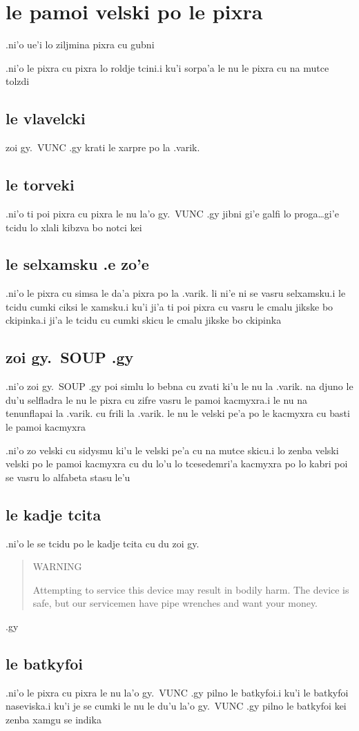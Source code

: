 \documentclass{report}
\begin{document}
\section{le pamoi velski po le pixra}
.ni'o ue'i lo ziljmina pixra cu gubni

.ni'o le pixra cu pixra lo roldje tcini\@  .i ku'i sorpa'a le nu le pixra cu na mutce tolzdi
\subsection{le vlavelcki}
zoi gy.\ VUNC .gy krati le xarpre po la .varik.
\subsection{le torveki}
.ni'o ti poi pixra cu pixra le nu la'o gy.\ VUNC .gy jibni gi'e galfi lo proga\ldots gi'e tcidu lo xlali kibzva bo notci kei
\subsection{le selxamsku .e zo'e}
.ni'o le pixra cu simsa le da'a pixra po la .varik. li ni'e ni se vasru selxamsku\@  .i le tcidu cumki ciksi le xamsku\@  .i ku'i ji'a ti poi pixra cu vasru le cmalu jikske bo ckipinka\@  .i ji'a le tcidu cu cumki skicu le cmalu jikske bo ckipinka
\subsection{zoi gy.\ SOUP .gy}
.ni'o zoi gy.\ SOUP .gy poi simlu lo bebna cu zvati ki'u le nu la .varik. na djuno le du'u selfladra le nu le pixra cu zifre vasru le pamoi kacmyxra\@  .i le nu na tenunflapai la .varik. cu frili la .varik. le nu le velski pe'a po le kacmyxra cu basti le pamoi kacmyxra

.ni'o zo velski cu sidysmu ki'u le velski pe'a cu na mutce skicu\@  .i lo zenba velski velski po le pamoi kacmyxra cu du lo'u lo tcesedemri'a kacmyxra po lo kabri poi se vasru lo alfabeta stasu le'u
\subsection{le kadje tcita}
.ni'o le se tcidu po le kadje tcita cu du zoi gy.
\begin{quote}
	WARNING

	Attempting to service this device may result in bodily harm.  The device is safe, but our servicemen have pipe wrenches and want your money.
\end{quote}
.gy
\subsection{le batkyfoi}
.ni'o le pixra cu pixra le nu la'o gy.\ VUNC .gy pilno le batkyfoi\@  .i ku'i le batkyfoi naseviska\@  .i ku'i je se cumki le nu le du'u la'o gy.\ VUNC .gy pilno le batkyfoi kei zenba xamgu se indika
\end{document}
